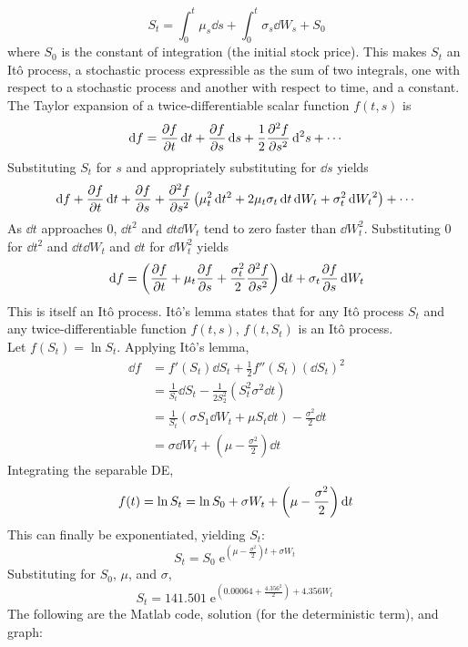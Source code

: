\documentclass[12pt, A4]{article}
\DeclareMathOperator{\en}{e}
\begin{document}
			\[S_t = \int_0^t\mu_s\dd{s} + \int_0^t\sigma_s\dd{W}_s + S_0\]
			where \(S_0\) is the constant of integration (the initial stock price). This makes \(S_t\) an It\^o process, a stochastic process expressible as the sum of two integrals, one with respect to a stochastic process and another with respect to time, and a constant. \\
		The Taylor expansion of a twice-differentiable scalar function \(f(t, s)\) is
			\[\dd{f} = \pdv{f}{t}\dd{t} + \pdv{f}{s}\dd{s} + \frac{1}{2}\pdv[2]{f}{s}\dd[2]{s} + \cdots\]
			Substituting \(S_t\) for \(s\) and appropriately substituting for \(\dd{s}\) yields
			\[\dd{f} + \pdv{f}{t}\dd{t} + \pdv{f}{s} (\mu_t\dd{t} + \sigma_t\dd{W_t}) + \pdv[2]{f}{s}\left(\mu_t^2\dd{t^2} + 2\mu_t\sigma_t\dd{t}\dd{W_t} + \sigma_t^2\dd{W_t}^2\right) + \cdots\]
			As \(\dd{t}\) approaches 0, \(\dd{t}^2\) and \(\dd{t}\dd{W_t}\) tend to zero faster than \(\dd{W_t^2}\). Substituting 0 for \(\dd{t^2}\) and \(\dd{t}\dd{W_t}\) and \(\dd{t}\) for \(\dd{W_t^2}\) yields
			\[\dd{f} = \left(\pdv{f}{t} + \mu_t\pdv{f}{s} + \frac{\sigma_t^2}{2}\pdv[2]{f}{s}\right)\dd{t} + \sigma_t\pdv{f}{s}\dd{W_t}\]
			This is itself an It\^o process. It\^o's lemma states that for any It\^o process \(S_t\) and any twice-differentiable function \(f(t, s)\), \(f(t, S_t)\) is an It\^o process. \\
		Let \(f(S_t) = \ln S_t\). Applying It\^o's lemma,
			\begin{align*}
				\dd{f} &= f'(S_t)\dd{S_t} + \frac{1}{2}f''(S_t)(\dd{S_t})^2 \\
					&= \frac{1}{S_t}\dd{S_t} - \frac{1}{2S_2^2}\left(S_t^2\sigma^2\dd{t}\right) \\
					&= \frac{1}{S_t}(\sigma S_1 \dd{W_t} + \mu S_t \dd{t}) - \frac{\sigma^2}{2}\dd{t} \\
					&= \sigma \dd{W_t} + \left(\mu - \frac{\sigma^2}{2}\right)\dd{t}
			\end{align*}
			Integrating the separable DE,
			\[
				f(t) = \ln S_t 
					= \ln S_0 + \sigma W_t + \left(\mu - \frac{\sigma^2}{2}\right)\dd{t} \\
			\]
			This can finally be exponentiated, yielding \(S_t\):
			\[S_t = S_0\en^{\left(\mu - \frac{\sigma^2}{2}\right)t + \sigma W_t}\]
			Substituting for \(S_0\), \(\mu\), and \(\sigma\),
			\[S_t = 141.501\en^{\left(0.00064 + \frac{4.356^2}{2} \right) + 4.356W_t}\]
			The following are the Matlab code, solution (for the deterministic term), and graph:
\end{document}
